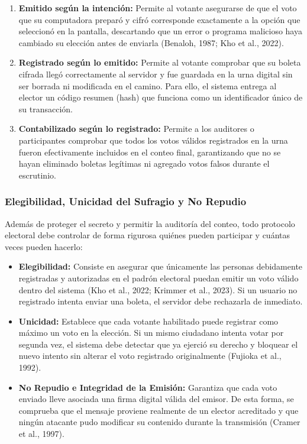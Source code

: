 \begin{enumerate}
	\item \textbf{Emitido según la intención:} Permite al votante asegurarse de que el voto que su computadora preparó y cifró corresponde exactamente a la opción que seleccionó en la pantalla, descartando que un error o programa malicioso haya cambiado su elección antes de enviarla (Benaloh, 1987; Kho et al., 2022).

	\item \textbf{Registrado según lo emitido:} Permite al votante comprobar que su boleta cifrada llegó correctamente al servidor y fue guardada en la urna digital sin ser borrada ni modificada en el camino. Para ello, el sistema entrega al elector un código resumen (hash) que funciona como un identificador único de su transacción.

	\item \textbf{Contabilizado según lo registrado:} Permite a los auditores o participantes comprobar que todos los votos válidos registrados en la urna fueron efectivamente incluidos en el conteo final, garantizando que no se hayan eliminado boletas legítimas ni agregado votos falsos durante el escrutinio.
\end{enumerate}

\subsubsection{Elegibilidad, Unicidad del Sufragio y No Repudio}

Además de proteger el secreto y permitir la auditoría del conteo, todo protocolo electoral debe controlar de forma rigurosa quiénes pueden participar y cuántas veces pueden hacerlo:

\begin{itemize}
	\item \textbf{Elegibilidad:} Consiste en asegurar que únicamente las personas debidamente registradas y autorizadas en el padrón electoral puedan emitir un voto válido dentro del sistema (Kho et al., 2022; Krimmer et al., 2023). Si un usuario no registrado intenta enviar una boleta, el servidor debe rechazarla de inmediato.

	\item \textbf{Unicidad:} Establece que cada votante habilitado puede registrar como máximo un voto en la elección. Si un mismo ciudadano intenta votar por segunda vez, el sistema debe detectar que ya ejerció su derecho y bloquear el nuevo intento sin alterar el voto registrado originalmente (Fujioka et al., 1992).

	\item \textbf{No Repudio e Integridad de la Emisión:} Garantiza que cada voto enviado lleve asociada una firma digital válida del emisor. De esta forma, se comprueba que el mensaje proviene realmente de un elector acreditado y que ningún atacante pudo modificar su contenido durante la transmisión (Cramer et al., 1997).
\end{itemize}


